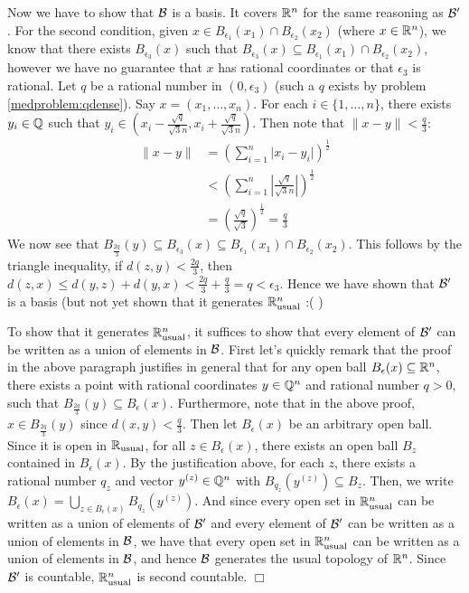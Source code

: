 \documentclass{article}
\begin{document}
{    Now we have to show that $\mathcal{B}$ is a basis. It covers $\mathbb{R}^{n}$ for the same reasoning as $\mathcal{B}'$. For the second condition, given $x\in B_{\epsilon_{1}}(x_{1})\cap B_{\epsilon_{2}}(x_{2})$ (where $x\in \mathbb{R}^{n}$), we know that there exists $B_{\epsilon_{3}}(x)$ such that $B_{\epsilon_{3}}(x)\subseteq B_{\epsilon_{1}}(x_{1})\cap B_{\epsilon_{2}}(x_{2})$, however we have no guarantee that $x$ has rational coordinates or that $\epsilon_{3}$ is rational. Let $q$ be a rational number in $(0,\epsilon_{3})$ (such a $q$ exists by problem \ref{medproblem:qdense}). Say $x = (x_{1},\dots, x_{n})$. For each $i\in\{1,\dots, n\}$, there exists $y_{i}\in \mathbb{Q}$ such that $y_{i}\in (x_{i}-\frac{\sqrt{q}}{\sqrt{3}n},x_{i} + \frac{\sqrt{q}}{\sqrt{3}n})$. Then note that $\| x-y\| < \frac{q}{3}$:
    \begin{align*}
        \| x-y\| &= \left(\sum_{i = 1}^{n}\lvert x_{i}-y_{i}\rvert\right)^{\frac{1}{2}}\\
        &<\left(\sum_{i = 1}^{n}\left\lvert \frac{\sqrt{q}}{\sqrt{3}n}\right\rvert\right)^{\frac{1}{2}}\\
        &= \left(\frac{\sqrt{q}}{\sqrt{3}}\right)^{\frac{1}{2}} = \frac{q}{3}
    \end{align*}
    We now see that $B_{\frac{2q}{3}}(y)\subseteq B_{\epsilon_{3}}(x)\subseteq B_{\epsilon_{1}}(x_{1})\cap B_{\epsilon_{2}}(x_{2})$. This follows by the triangle inequality, if $d(z,y) < \frac{2q}{3}$, then $d(z,x) \leq d(y,z) + d(y,x) < \frac{2q}{3} + \frac{q}{3} = q < \epsilon_{3}$. Hence we have shown that $\mathcal{B}'$ is a basis (but not yet shown that it generates $\mathbb{R}_{\text{usual}}^{n}$ :( )

    To show that it generates $\mathbb{R}_{\text{usual}}^{n}$, it suffices to show that every element of $\mathcal{B}'$ can be written as a union of elements in $\mathcal{B}$. First let's quickly remark that the proof in the above paragraph justifies in general that for any open ball $B_{\epsilon}(x)\subseteq \mathbb{R}^{n}$, there exists a point with rational coordinates $y\in \mathbb{Q}^{n}$ and rational number $q > 0$, such that $B_{\frac{2q}{3}}(y)\subseteq B_{\epsilon}(x)$. Furthermore, note that in the above proof, $x\in B_{\frac{2q}{3}}(y)$ since $d(x,y) < \frac{q}{3}$. Then let $B_{\epsilon}(x)$ be an arbitrary open ball. Since it is open in $\mathbb{R}_{\text{usual}}$, for all $z\in B_{\epsilon}(x)$, there exists an open ball $B_{z}$ contained in $B_{\epsilon}(x)$. By the justification above, for each $z$, there exists a rational number $q_{z}$ and vector $y^{(z)}\in \mathbb{Q}^{n}$ with $B_{q_{z}}(y^{(z)})\subseteq B_{z}$. Then, we write $B_{\epsilon}(x) = \bigcup_{z\in B_{\epsilon}(x)}B_{q_{z}}(y^{(z)})$. And since every open set in $\mathbb{R}_{\text{usual}}^{n}$ can be written as a union of elements of $\mathcal{B}'$ and every element of $\mathcal{B}'$ can be written as a union of elements in $\mathcal{B}$, we have that every open set in $\mathbb{R}_{\text{usual}}^{n}$ can be written as a union of elements in $\mathcal{B}$, and hence $\mathcal{B}$ generates the usual topology of $\mathbb{R}^{n}$. Since $\mathcal{B}'$ is countable, $\mathbb{R}_{\text{usual}}^{n}$ is second countable. $\Box$
}
\end{document}

